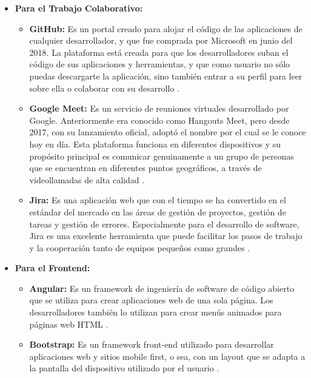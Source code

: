 \documentclass[stu, 12pt, letterpaper, donotrepeattitle, floatsintext, natbib]{apa7}
\begin{document}
\begin{itemize}
	\item \textbf{Para el Trabajo Colaborativo:}
	
	\begin{itemize}
		\item \textbf{GitHub:} Es un portal creado para alojar el código de las aplicaciones de cualquier desarrollador, y que fue comprada por Microsoft en junio del 2018. La plataforma está creada para que los desarrolladores suban el código de sus aplicaciones y herramientas, y que como usuario no sólo puedas descargarte la aplicación, sino también entrar a su perfil para leer sobre ella o colaborar con su desarrollo \cite{xatakaGithub}.
		
		\item \textbf{Google Meet:} Es un servicio de reuniones virtuales desarrollado por Google. Anteriormente era conocido como Hangouts Meet, pero desde 2017, con su lanzamiento oficial, adoptó el nombre por el cual se le conoce hoy en día. Esta plataforma funciona en diferentes dispositivos y su propósito principal es comunicar genuinamente a un grupo de personas que se encuentran en diferentes puntos geográficos, a través de videollamadas de alta calidad \cite{hubspotGoogleMeet}.
		
		\item \textbf{Jira:} Es una aplicación web que con el tiempo se ha convertido en el estándar del mercado en las áreas de gestión de proyectos, gestión de tareas y gestión de errores. Especialmente para el desarrollo de software, Jira es una excelente herramienta que puede facilitar los pasos de trabajo y la cooperación tanto de equipos pequeños como grandes \cite{ionosJira}.
		
	\end{itemize}
	
	\item \textbf{Para el Frontend:}
	
	\begin{itemize}
		
		\item \textbf{Angular:} Es un framework de ingeniería de software de código abierto que se utiliza para crear aplicaciones web de una sola página. Los desarrolladores también lo utilizan para crear menús animados para páginas web HTML \cite{hostingerAngular}.
		
		\item \textbf{Bootstrap:} Es un framework front-end utilizado para desarrollar aplicaciones web y sitios mobile first, o sea, con un layout que se adapta a la pantalla del dispositivo utilizado por el usuario \cite{rockcontent-bootstrap}.
		

\end{itemize}
\end{itemize}
\end{document}
